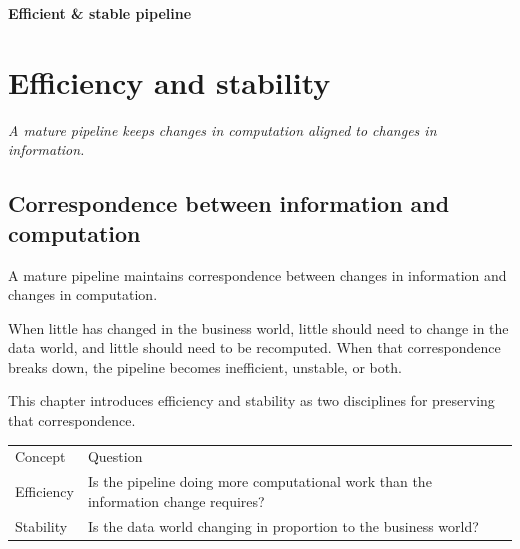 \documentclass[10pt,openany,10pt]{book}
\newcounter{none}
\let\podeToprule\toprule
\let\podeMidrule\midrule
\let\podeBottomrule\bottomrule
\renewcommand{\toprule}{\arrayrulecolor{pbiGrid}\podeToprule}
\renewcommand{\midrule}{\arrayrulecolor{pbiGrid}\podeMidrule}
\renewcommand{\bottomrule}{\arrayrulecolor{pbiGrid}\podeBottomrule}
\begin{document}
\newpage

\thispagestyle{empty}
\hypertarget{docs-efficient-stable-pipeline}{}
\vspace*{0.34\textheight}
\begin{center}
{\Huge\bfseries Efficient \& stable pipeline}
\end{center}
\newpage

\chapter{Efficiency and
stability}\label{docs-efficient-stable-pipeline-efficiency-and-stability}

\emph{A mature pipeline keeps changes in computation aligned to changes
in information.}

\section{Correspondence between information and
computation}\label{correspondence-between-information-and-computation}

A mature pipeline maintains correspondence between changes in
information and changes in computation.

When little has changed in the business world, little should need to
change in the data world, and little should need to be recomputed. When
that correspondence breaks down, the pipeline becomes inefficient,
unstable, or both.

This chapter introduces efficiency and stability as two disciplines for
preserving that correspondence.

{\def\LTcaptype{none} %
\begin{longtable}[]{@{}
  >{\raggedright\arraybackslash}p{}
  >{\raggedright\arraybackslash}p{}@{}}
\toprule\noalign{}
\begin{minipage}[b]{\linewidth}\raggedright
Concept
\end{minipage} & \begin{minipage}[b]{\linewidth}\raggedright
Question
\end{minipage} \\
\midrule\noalign{}
\endhead
\bottomrule\noalign{}
\endlastfoot
Efficiency & Is the pipeline doing more computational work than the
information change requires? \\
Stability & Is the data world changing in proportion to the business
world? \\
\end{longtable}
}
\end{document}
